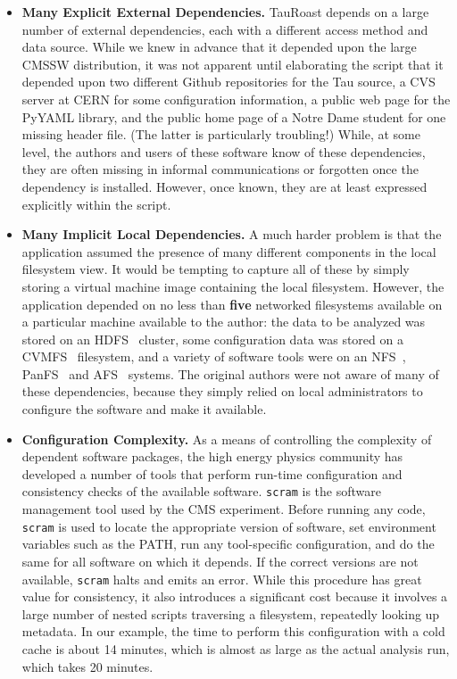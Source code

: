 \documentclass[procedia]{easychair}
\begin{document}
\begin{itemize}

\item {\bf Many Explicit External Dependencies.}  TauRoast depends on a large number of
external dependencies, each with a different access method and data source.
While we knew in advance that it depended upon the large CMSSW distribution,
it was not apparent until elaborating the script that it depended upon
two different Github repositories for the Tau source,
a CVS server at CERN for some configuration information, a public web page
for the PyYAML library, and the public home page of a Notre Dame student
for one missing header file.  (The latter is particularly troubling!)
While, at some level, the authors and users of these software know of these dependencies, they are often missing in
informal communications or forgotten once the dependency is installed.
However, once known, they are at least expressed explicitly within the script.

\item {\bf Many Implicit Local Dependencies.} A much harder problem is that the
application assumed the presence of many different components in the local
filesystem view. It would be tempting to capture all of these by simply
storing a virtual machine image containing the local filesystem. However,
the application depended on no less than {\bf five} networked filesystems
available on a particular machine available to the author:
the data to be analyzed was stored on an HDFS~\cite{borthakur2008hdfs} cluster,
some configuration data was stored on a CVMFS~\cite{blomer2011cernvm} filesystem,
and a variety of software tools were on an NFS~\cite{howard1988scale},
PanFS~\cite{welch2008scalable} and AFS~\cite{sandberg1985design} systems.
The original authors were not aware of many of these dependencies,
because they simply relied on local administrators to configure the
software and make it available.

\item {\bf Configuration Complexity.}  As a means of controlling the complexity
of dependent software packages, the high energy physics community has developed
a number of tools that perform run-time configuration and consistency checks
of the available software.  {\tt scram} is the software management tool used
by the CMS experiment.  Before running any code, {\tt scram} is used to locate
the appropriate version of software,  set environment variables such as the PATH, run any
tool-specific configuration, and do the same for all software on which it depends.
If the correct versions are not available, {\tt scram} halts and emits an error.
While this procedure has great value for consistency, it also introduces a significant cost
because it involves a large number of nested scripts traversing a filesystem,
repeatedly looking up metadata.  In our example, the time to perform this configuration
with a cold cache is about 14 minutes, which is almost as large as the actual analysis
run, which takes 20 minutes.


\end{itemize}
\end{document}
